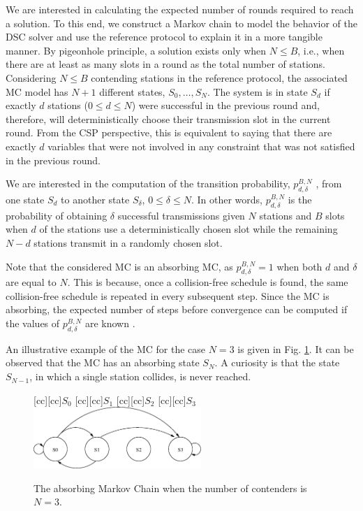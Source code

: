 \documentclass[journal]{IEEEtran}
\begin{document}
We are interested in calculating the expected number of rounds required to reach a solution. To this end, we construct a Markov chain to model the behavior of the DSC solver and use the reference protocol to explain it in a more tangible manner.
By pigeonhole principle, a solution exists only when $N\leq B$, i.e., when there are at least as many slots in a round as the total number of stations. Considering $N\leq B$ contending stations in the reference protocol, the associated MC model has $N+1$ different states, $S_0, \dots, S_N$.
The system is in state $S_d$ if exactly $d$ stations ($0 \leq d \leq N$) were successful in the previous round and, therefore, will deterministically choose their transmission slot in the current round.
From the CSP perspective, this is equivalent to saying that there are exactly $d$ variables that were not involved in any constraint that was not satisfied in the previous round.

We are interested in the computation of the transition probability, $p_{d,\delta}^{B,N}$ , from one state $S_d$ to another state $S_\delta$, $0 \leq \delta \leq N$. In other words, $p_{d,\delta}^{B,N}$ is the probability of obtaining $\delta$ successful transmissions given $N$ stations and $B$ slots when $d$ of the stations use a deterministically chosen slot while the remaining $N-d$ stations transmit in a randomly chosen slot.

Note that the considered MC is an absorbing MC, as $p_{d,\delta}^{B,N}=1$ when both $d$ and $\delta$ are equal to $N$. This is because, once a collision-free schedule is found, the same collision-free schedule is repeated in every subsequent step.
Since the MC is absorbing, the expected number of steps before convergence can be computed if the values of $p_{d,\delta}^{B,N}$ are known \cite{grinstead1997ip}.

An illustrative example of the MC for the case $N=3$ is given in Fig. \ref{fig:markov_chain}.
It can be observed that the MC has an absorbing state $S_{N}$.
A curiosity is that the state $S_{N-1}$, in which a single station collides, is never reached.
\begin{figure}
  [cc][cc]{$S_0$}
  [cc][cc]{$S_1$}
  [cc][cc]{$S_2$}
  [cc][cc]{$S_3$}
  \centering
  \includegraphics[width=2.5in]{figures/markov_chain}
  \caption{The absorbing Markov Chain when the number of contenders is $N=3$.}
  \label{fig:markov_chain}
\end{figure}
\end{document}
